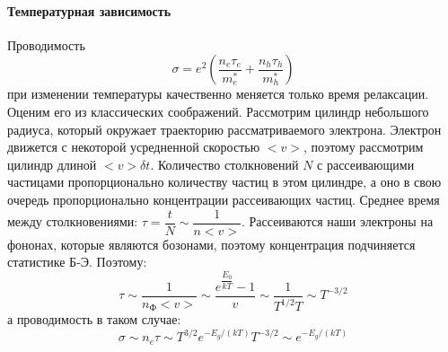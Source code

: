 \paragraph{Температурная зависимость}
Проводимость
\[
  \sigma = e^2 \left( \dfrac{n_e \tau_e}{m_e^*} + \dfrac{n_h \tau_h}{m_h^*} \right) 
\]
при изменении температуры качественно меняется только время релаксации. Оценим его из классических соображений. Рассмотрим цилиндр небольшого радиуса, который окружает траекторию рассматриваемого электрона. Электрон движется с некоторой усредненной скоростью $<v>$, поэтому рассмотрим цилиндр длиной $<v> \delta t$. Количество столкновений $N$ с рассеивающими частицами пропорционально количеству частиц в этом цилиндре, а оно в свою очередь пропорционально концентрации рассеивающих частиц. Среднее время между столкновениями: $\tau = \dfrac{t}{N} \sim \dfrac{1}{n <v>}$. Рассеиваются наши электроны на фононах, которые являются бозонами, поэтому концентрация подчиняется статистике Б-Э. Поэтому:
\[
  \tau \sim \dfrac{1}{n_\text{Ф} <v>} \sim \dfrac{e^{\dfrac{E_0}{kT}} - 1}{v}
  \sim \dfrac{1}{T^{1/2} T} \sim T^{-3/2}
\]
а проводимость в таком случае:
\[
  \sigma \sim n_e \tau \sim T^{3/2} e^{-E_g / (kT)} T^{-3/2} \sim e^{-E_g / (kT)}
\]
